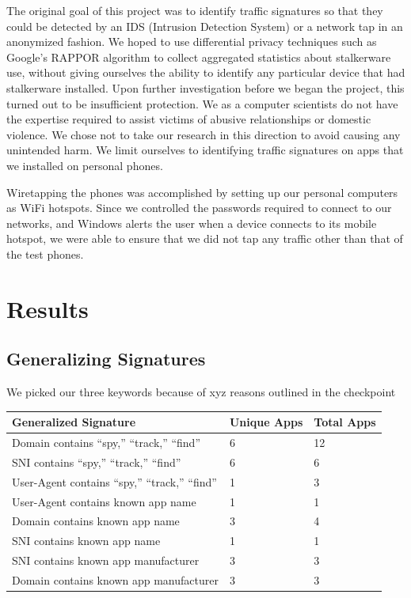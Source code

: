 \documentclass[acmtog]{acmart}
\begin{document}
The original goal of this project was to identify traffic signatures so that 
they could be detected by an IDS (Intrusion Detection System) or a network 
tap in an anonymized fashion. We hoped to use differential privacy techniques 
such as Google's RAPPOR algorithm \cite{erlingsson_rappor:_2014} to collect 
aggregated statistics about stalkerware use, without giving ourselves the 
ability to identify any particular device that had stalkerware installed. Upon 
further investigation before we began the project, this turned out to be 
insufficient protection. We as a computer 
scientists do not have the expertise required to assist victims of abusive 
relationships or domestic violence. We chose not to take our research in this 
direction to avoid causing any unintended harm. We limit ourselves to 
identifying traffic signatures on apps that we installed on personal phones.

Wiretapping the phones was accomplished by setting up our personal computers as 
WiFi hotspots. Since we controlled the passwords required to connect to our 
networks, and Windows alerts the user when a device connects to its mobile 
hotspot, we were able to ensure that we did not tap any traffic other than that 
of the test phones. 
\section{Results}

\subsection{Generalizing Signatures}

We picked our three keywords because of xyz reasons outlined in the checkpoint

\begin{table}
	\begin{tabular}{p{5cm}p{5cm}p{5cm}}
		\toprule
		Generalized Signature & Unique Apps & Total Apps \\
		\hline
		Domain contains “spy,” “track,” “find” & 6 & 12 \\
		SNI contains “spy,” “track,” “find” & 6 & 6 \\
		User-Agent contains “spy,” “track,” “find” & 1 & 3 \\
		User-Agent contains known app name & 1 & 1 \\
		Domain contains known app name & 3 & 4 \\
		SNI contains known app name & 1 & 1 \\
		SNI contains known app manufacturer & 3 & 3 \\
		Domain contains known app manufacturer & 3 & 3 \\
		\midrule
	\end{tabular}
\end{table}
\end{document}
